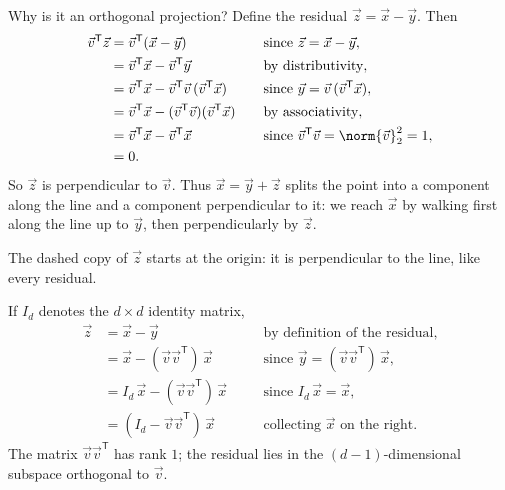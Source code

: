 \documentclass[a4paper,12pt,oneside]{report}
\begin{document}
Why is it an orthogonal projection? Define the residual
$\vec z=\vec x-\vec y$. Then
\[
\begin{aligned}
  \vec v^{\mathsf T}\vec z
    &=\vec v^{\mathsf T}(\vec x-\vec y)
      &&\quad\text{since } \vec z=\vec x-\vec y,\\
    &=\vec v^{\mathsf T}\vec x-\vec v^{\mathsf T}\vec y
      &&\quad\text{by distributivity},\\
    &=\vec v^{\mathsf T}\vec x
      -\vec v^{\mathsf T}\vec v\,(\vec v^{\mathsf T}\vec x)
      &&\quad\text{since } \vec y=\vec v\,(\vec v^{\mathsf T}\vec x),\\
    &=\vec v^{\mathsf T}\vec x
      -(\vec v^{\mathsf T}\vec v)(\vec v^{\mathsf T}\vec x)
      &&\quad\text{by associativity},\\
    &=\vec v^{\mathsf T}\vec x-\vec v^{\mathsf T}\vec x
      &&\quad\text{since } \vec v^{\mathsf T}\vec v=\norm{\vec v}_2^2=1,\\
    &=0.
\end{aligned}
\]
So $\vec z$ is perpendicular to $\vec v$. Thus $\vec x=\vec y+\vec z$
splits the point into a component along the line and a component
perpendicular to it: we reach $\vec x$ by walking first along the
line up to $\vec y$, then perpendicularly by $\vec z$.
\begin{center}
\end{center}
The dashed copy of $\vec z$ starts at the origin: it is perpendicular
to the line, like every residual.

If $I_d$ denotes the $d\times d$ identity matrix,
\[
\begin{aligned}
  \vec z&=\vec x-\vec y
    &&\quad\text{by definition of the residual},\\
  &=\vec x-(\vec v\vec v^{\mathsf T})\,\vec x
    &&\quad\text{since } \vec y=(\vec v\vec v^{\mathsf T})\,\vec x,\\
  &=I_d\,\vec x-(\vec v\vec v^{\mathsf T})\,\vec x
    &&\quad\text{since } I_d\,\vec x=\vec x,\\
  &=(I_d-\vec v\vec v^{\mathsf T})\,\vec x
    &&\quad\text{collecting } \vec x \text{ on the right}.
\end{aligned}
\]
The matrix $\vec v\vec v^{\mathsf T}$ has rank $1$; the residual
lies in the $(d-1)$-dimensional subspace orthogonal to $\vec v$.
\end{document}
